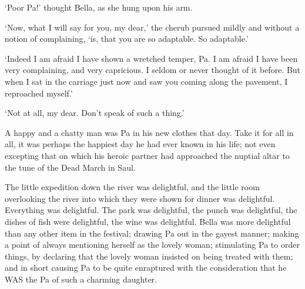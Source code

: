 ‘Poor Pa!’ thought Bella, as she hung upon his arm.

‘Now, what I will say for you, my dear,’ the cherub pursued mildly and
without a notion of complaining, ‘is, that you are so adaptable. So
adaptable.’

‘Indeed I am afraid I have shown a wretched temper, Pa. I am afraid
I have been very complaining, and very capricious. I seldom or never
thought of it before. But when I sat in the carriage just now and saw
you coming along the pavement, I reproached myself.’

‘Not at all, my dear. Don’t speak of such a thing.’

A happy and a chatty man was Pa in his new clothes that day. Take it
for all in all, it was perhaps the happiest day he had ever known in his
life; not even excepting that on which his heroic partner had approached
the nuptial altar to the tune of the Dead March in Saul.

The little expedition down the river was delightful, and the little
room overlooking the river into which they were shown for dinner was
delightful. Everything was delightful. The park was delightful, the
punch was delightful, the dishes of fish were delightful, the wine
was delightful. Bella was more delightful than any other item in the
festival; drawing Pa out in the gayest manner; making a point of always
mentioning herself as the lovely woman; stimulating Pa to order things,
by declaring that the lovely woman insisted on being treated with them;
and in short causing Pa to be quite enraptured with the consideration
that he WAS the Pa of such a charming daughter.

